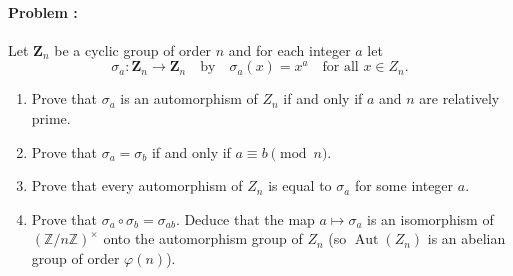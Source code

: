 \paragraph{Problem :} Let $\mathbf{Z}_n$ be a cyclic group of order $n$ and for each integer $a$ let
  \[
    \sigma_a : \mathbf{Z}_n \to \mathbf{Z}_n \quad \text{by} \quad \sigma_a(x) = x^a \quad \text{for all } x \in Z_n.
  \]
  \begin{enumerate}
    \item Prove that $\sigma_a$ is an automorphism of $Z_n$ if and only if $a$ and $n$ are relatively prime.
    \item Prove that $\sigma_a = \sigma_b$ if and only if $a \equiv b \pmod{n}$.
    \item Prove that every automorphism of $Z_n$ is equal to $\sigma_a$ for some integer $a$.
    \item Prove that $\sigma_a \circ \sigma_b = \sigma_{ab}$. Deduce that the map 
    $a \mapsto \sigma_a$ is an isomorphism of $(\mathbb{Z}/n\mathbb{Z})^\times$ 
    onto the automorphism group of $Z_n$ (so $\operatorname{Aut}(Z_n)$ is an abelian group 
    of order $\varphi(n)$).
  \end{enumerate}
